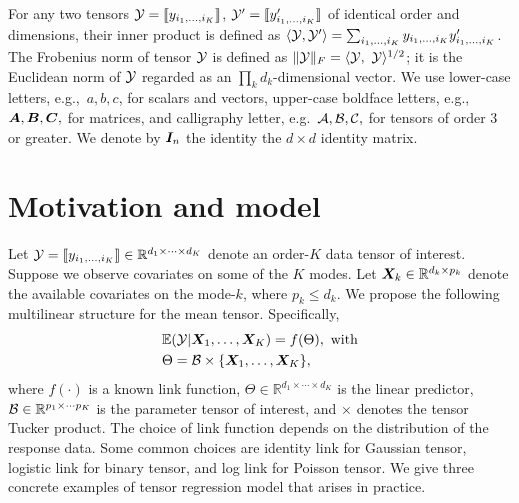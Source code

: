 \documentclass[twoside]{article}
\theoremstyle{plain}
\theoremstyle{definition}
\begin{document}
For any two tensors $\mathcal{Y}=\llbracket y_{i_1,\ldots,i_K} \rrbracket$, $\mathcal{Y}'=\llbracket y'_{i_1,\ldots,i_K} \rrbracket$ of identical order and dimensions, their inner product is defined as $\langle \mathcal{Y}, \mathcal{Y}'\rangle =\sum_{i_1,\ldots,i_K}y_{i_1,\ldots,i_K}y'_{i_1,\ldots,i_K}$. The Frobenius norm of tensor $\mathcal{Y}$ is defined as $\FnormSize{}{\tY}=\langle \tY,\ \tY \rangle^{1/2}$; it is the Euclidean norm of $\mathcal{Y}$ regarded as an $\prod_k d_k$-dimensional vector. We use lower-case letters, e.g.,\ $a,b,c$, for scalars and vectors, upper-case boldface letters, e.g., $\bm A,\bm B,\bm C,$ for matrices, and calligraphy letter, e.g.\ $\mathcal{A}, \mathcal{B}, \mathcal{C},$ for tensors of order 3 or greater. We denote by $\bm I_n$ the identity the $d \times d$ identity matrix. 


\section{Motivation and model}\label{sec:model}
Let $\mathcal{Y}=\llbracket y_{i_1,\ldots,i_K} \rrbracket\in\mathbb{R}^{d_1\times \cdots\times d_K}$ denote an order-$K$ data tensor of interest. Suppose we observe covariates on some of the $K$ modes. Let $\bm X_k\in\mathbb{R}^{d_k\times p_k}$ denote the available covariates on the mode-$k$, where $p_k\leq d_k$. We propose the following multilinear structure for the mean tensor. Specifically, 
\begin{align}\label{eq:tensormodel}
&\mathbb{E}(\mathcal{Y}|\bm X_1,\ldots,\bm X_K)=f(\Theta),\ \text{with}\\
&\Theta =\mathcal{B}\times\{\bm X_1,\ldots,\bm X_K\} ,
\end{align}
where $f(\cdot)$ is a known link function, $\Theta\in\mathbb{R}^{d_1\times \cdots\times d_K}$ is the linear predictor, $\mathcal{B}\in\mathbb{R}^{p_1\times \cdots p_K}$ is the parameter tensor of interest, and $\times$ denotes the tensor Tucker product. The choice of link function depends on the distribution of the response data. Some common choices are identity link for Gaussian tensor, logistic link for binary tensor, and log link for Poisson tensor. We give three concrete examples of tensor regression model that arises in practice. 
\end{document}
